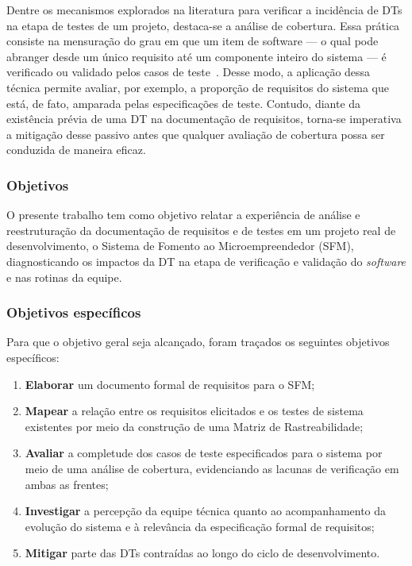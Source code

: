 Dentre os mecanismos explorados na literatura para verificar a incidência de DTs na etapa de testes de um projeto, destaca-se a análise de cobertura. Essa prática consiste na mensuração do grau em que um item de software --- o qual pode abranger desde um único requisito até um componente inteiro do sistema --- é verificado ou validado pelos casos de teste~\cite{21}. Desse modo, a aplicação dessa técnica permite avaliar, por exemplo, a proporção de requisitos do sistema que está, de fato, amparada pelas especificações de teste. Contudo, diante da existência prévia de uma DT na documentação de requisitos, torna-se imperativa a mitigação desse passivo antes que qualquer avaliação de cobertura possa ser conduzida de maneira eficaz.

\subsubsection{Objetivos}

O presente trabalho tem como objetivo relatar a experiência de análise e reestruturação da documentação de requisitos e de testes em um projeto real de desenvolvimento, o Sistema de Fomento ao Microempreendedor (SFM), diagnosticando os impactos da DT na etapa de verificação e validação do \textit{software} e nas rotinas da equipe.

\subsubsection{Objetivos específicos}

Para que o objetivo geral seja alcançado, foram traçados os seguintes objetivos específicos:
\begin{enumerate}[topsep=0em]
    \itemsep=0.3em
    \item \textbf{Elaborar} um documento formal de requisitos para o SFM;
    \item \textbf{Mapear} a relação entre os requisitos elicitados e os testes de sistema existentes por meio da construção de uma Matriz de Rastreabilidade;
    \item \textbf{Avaliar} a completude dos casos de teste especificados para o sistema por meio de uma análise de cobertura, evidenciando as lacunas de verificação em ambas as frentes;
    \item \textbf{Investigar} a percepção da equipe técnica quanto ao acompanhamento da evolução do sistema e à relevância da especificação formal de requisitos;
    \item \textbf{Mitigar} parte das DTs contraídas ao longo do ciclo de desenvolvimento.
\end{enumerate}

